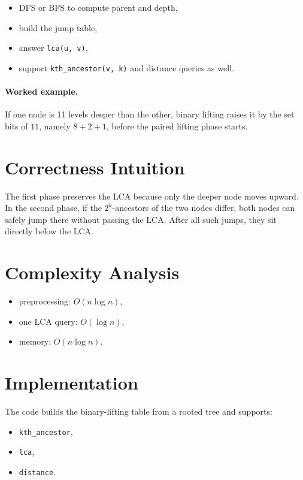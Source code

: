 \begin{itemize}
  \item DFS or BFS to compute parent and depth,
  \item build the jump table,
  \item answer \texttt{lca(u, v)},
  \item support \texttt{kth\_ancestor(v, k)} and distance queries as well.
\end{itemize}

\paragraph{Worked example.}
If one node is 11 levels deeper than the other, binary lifting raises it by the set bits of \(11\), namely
\(8 + 2 + 1\), before the paired lifting phase starts.

\section*{Correctness Intuition}

The first phase preserves the LCA because only the deeper node moves upward. In the second phase, if the
\(2^k\)-ancestors of the two nodes differ, both nodes can safely jump there without passing the LCA. After all such
jumps, they sit directly below the LCA.

\section*{Complexity Analysis}

\begin{itemize}
  \item preprocessing: \(O(n \log n)\),
  \item one LCA query: \(O(\log n)\),
  \item memory: \(O(n \log n)\).
\end{itemize}

\section*{Implementation}

The code builds the binary-lifting table from a rooted tree and supports:

\begin{itemize}
  \item \texttt{kth\_ancestor},
  \item \texttt{lca},
  \item \texttt{distance}.
\end{itemize}

